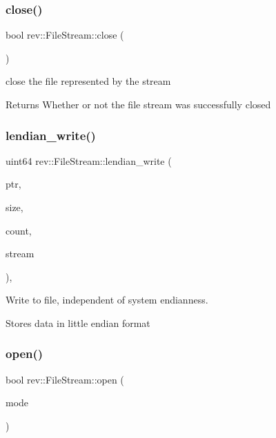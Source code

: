 \subsubsection{\texorpdfstring{close()}{close()}}
{\footnotesize\ttfamily bool rev\+::\+File\+Stream\+::close (\begin{DoxyParamCaption}{ }\end{DoxyParamCaption})\hspace{0.3cm}{\ttfamily [inline]}}



close the file represented by the stream 

\begin{DoxyReturn}{Returns}
Whether or not the file stream was successfully closed 
\end{DoxyReturn}
\mbox{\label{classrev_1_1_file_stream_a482c8ed3834230ebe085b12396286a3a}} 
\subsubsection{\texorpdfstring{lendian\_write()}{lendian\_write()}}
{\footnotesize\ttfamily uint64 rev\+::\+File\+Stream\+::lendian\+\_\+write (\begin{DoxyParamCaption}\item[{const void $\ast$}]{ptr,  }\item[{size\+\_\+t}]{size,  }\item[{const uint64 \&}]{count,  }\item[{F\+I\+LE $\ast$}]{stream }\end{DoxyParamCaption})\hspace{0.3cm}{\ttfamily [static]}, {\ttfamily [protected]}}



Write to file, independent of system endianness. 

Stores data in little endian format \mbox{\label{classrev_1_1_file_stream_a22ec65604c81039f7cb6564fe08f7cee}} 
\subsubsection{\texorpdfstring{open()}{open()}}
{\footnotesize\ttfamily bool rev\+::\+File\+Stream\+::open (\begin{DoxyParamCaption}\item[{File\+Access\+Modes}]{mode }\end{DoxyParamCaption})\hspace{0.3cm}{\ttfamily [inline]}}



